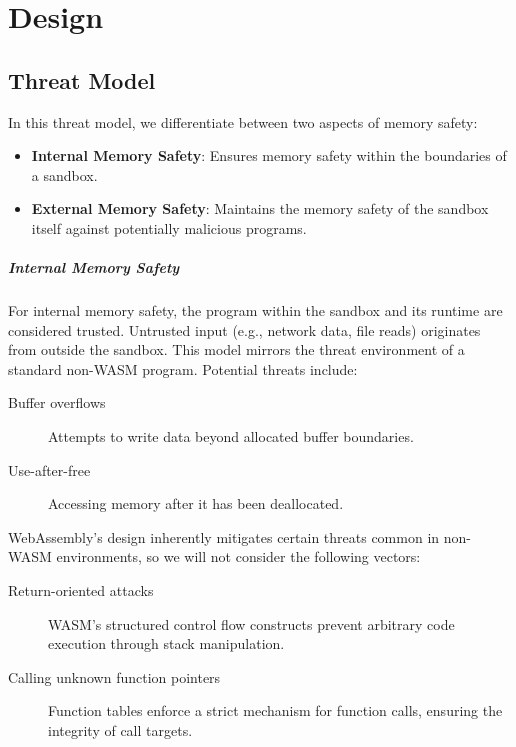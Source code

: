 \chapter{Design}
\label{ch:design}

\section{Threat Model}
\label{sec:threat-model}

In this threat model, we differentiate between two aspects of memory safety:


\begin{itemize}
    \item \textbf{Internal Memory Safety}: Ensures memory safety within the boundaries of a sandbox.
    \item \textbf{External Memory Safety}: Maintains the memory safety of the sandbox itself against potentially malicious programs.
\end{itemize}

\paragraph{Internal Memory Safety}
For internal memory safety, the program within the sandbox and its runtime are considered trusted.
Untrusted input (e.g., network data, file reads) originates from outside the sandbox.
This model mirrors the threat environment of a standard non-\ac{WASM} program.
Potential threats include:

\begin{description}
    \item[Buffer overflows] Attempts to write data beyond allocated buffer boundaries.
    \item[Use-after-free] Accessing memory after it has been deallocated.
\end{description}

WebAssembly's design inherently mitigates certain threats common in non-WASM environments, so we will not consider the following vectors:

\begin{description}
    \item[Return-oriented attacks] WASM's structured control flow constructs prevent arbitrary code execution through stack manipulation.
    \item[Calling unknown function pointers] Function tables enforce a strict mechanism for function calls, ensuring the integrity of call targets.
\end{description}

